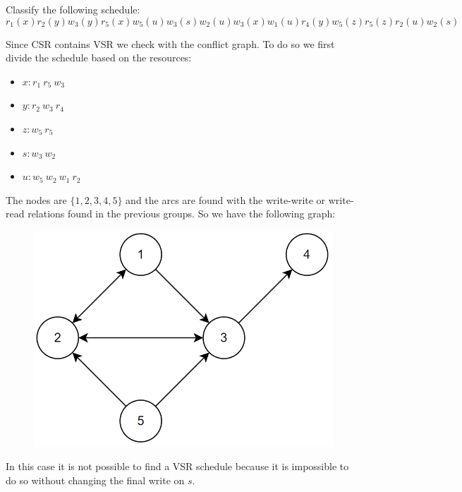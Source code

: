 \documentclass[12pt, a4paper]{report}
\newtheorem[style=M,bodystyle=\normalfont]{theorem}{Theorem}
\newtheorem[style=M,bodystyle=\normalfont]{corollary}{Corollary}
\newtheorem[style=M,bodystyle=\normalfont]{lemma}{Lemma}
\newtheorem[style=M,bodystyle=\normalfont]{definition}{Definition}
\begin{document}
    \begin{Exercise}[label=5]
        Classify the following schedule: 
        \[r_1(x) r_2(y) w_3(y) r_5(x) w_5(u) w_3(s)w_2(u) w_3(x) w_1(u) r_4(y) w_5(z) r_5(z) r_2(u) w_2(s)\]
    \end{Exercise}
    \begin{Answer}[ref=5]
        Since CSR contains VSR we check with the conflict graph. To do so we first divide the schedule based on the resources: 
        \begin{itemize}
            \item $x: r_1 \: r_5 \: w_3$
            \item $y: r_2 \: w_3 \: r_4$
            \item $z: w_5 \: r_5$
            \item $s: w_3 \: w_2$
            \item $u: w_5 \: w_2 \: w_1 \: r_2$
        \end{itemize}
        The nodes are $\{1,2,3,4,5\}$ and the arcs are found with the write-write or write-read relations found in the previous groups. So we have the following graph:
        \begin{figure}[H]
            \centering
            \includegraphics[width=0.5\linewidth]{images/conflictgraph2.png}
        \end{figure}
        In this case it is not possible to find a VSR schedule because it is impossible to do so without changing the final write on $s$. 
    \end{Answer}

    \newpage
\end{document}
